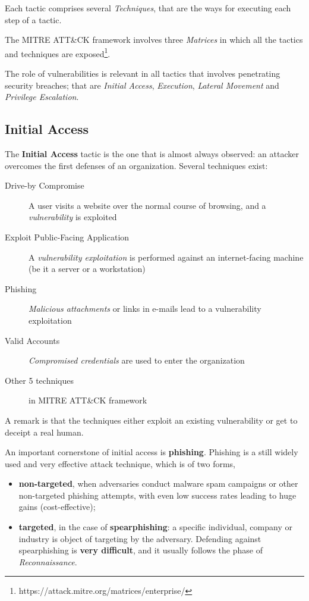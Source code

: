 \documentclass[10pt]{extbook}
\begin{document}
Each tactic comprises several \emph{Techniques}, that are the ways for
executing each step of a tactic.

The MITRE ATT\&CK framework involves three \emph{Matrices} in which all the
tactics and techniques are
exposed\footnote{https://attack.mitre.org/matrices/enterprise/}.

The role of vulnerabilities is relevant in all tactics that involves
penetrating security breaches; that are \emph{Initial Access},
\emph{Execution}, \emph{Lateral Movement} and \emph{Privilege Escalation}.

\subsection{Initial Access}

The \textbf{Initial Access} tactic is the one that is almost always observed:
an attacker overcomes the first defenses of an organization. Several techniques
exist:
\begin{description}
    \item[Drive\--by Compromise] A user visits a website over the normal course
        of browsing, and a \emph{vulnerability} is exploited
    \item[Exploit Public\--Facing Application] A \emph{vulnerability
        exploitation} is performed against an internet\--facing machine (be it
        a server or a workstation)
    \item[Phishing] \emph{Malicious attachments} or links in e\--mails lead to a
        vulnerability exploitation
    \item[Valid Accounts] \emph{Compromised credentials} are used to enter the organization
    \item[Other 5 techniques] in MITRE ATT\&CK framework
\end{description}

A remark is that the techniques either exploit an existing vulnerability or get
to deceipt a real human.

An important cornerstone of initial access is \textbf{phishing}. Phishing is a still widely used and very effective attack technique, which is of two forms,
\begin{itemize}
    \item \textbf{non\--targeted}, when adversaries conduct malware spam
        campaigns or other non\--targeted phishing attempts, with even low
        success rates leading to huge gains (cost\--effective);
    \item \textbf{targeted}, in the case of \textbf{spearphishing}: a specific
        individual, company or industry is object of targeting by the
        adversary. Defending against spearphishing is \textbf{very difficult},
        and it usually follows the phase of \emph{Reconnaissance}.
\end{itemize}
\end{document}
